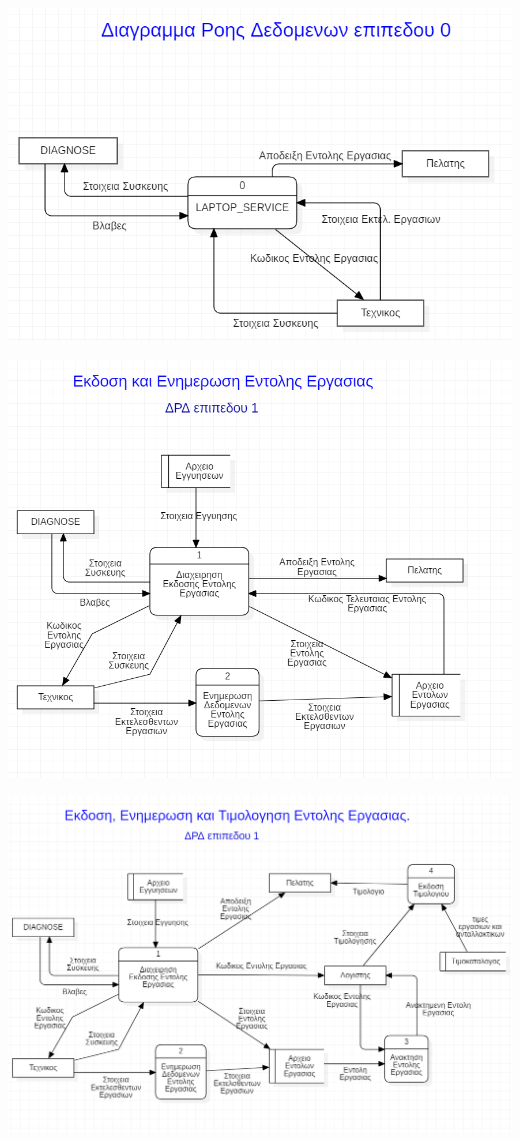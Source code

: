 \documentclass[12pt]{article}
\begin{document}
\begin{center}
\includegraphics[scale=1]{MerosB/B1}
\end{center}
\begin{center}
\includegraphics[scale=1]{MerosB/B2}
\end{center}
\begin{center}
\includegraphics[scale=0.7]{MerosB/B3}
\end{center}
\end{document}
